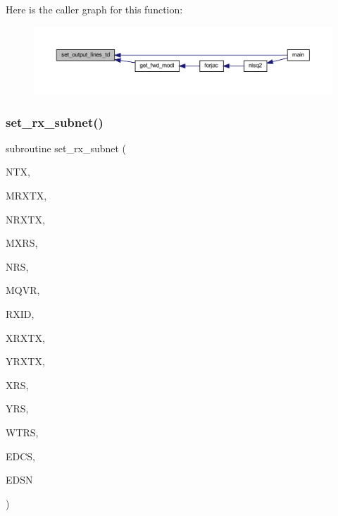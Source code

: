Here is the caller graph for this function\+:\nopagebreak
\begin{figure}[H]
\begin{center}
\leavevmode
\includegraphics[width=350pt]{Leroi_8f90_a2a5820b2a223f63d10cd7fe63469c604_icgraph}
\end{center}
\end{figure}
\mbox{\label{Leroi_8f90_a9100f1607055290b050e961c8027016a}} 
\subsubsection{\texorpdfstring{set\+\_\+rx\+\_\+subnet()}{set\_rx\_subnet()}}
{\footnotesize\ttfamily subroutine set\+\_\+rx\+\_\+subnet (\begin{DoxyParamCaption}\item[{integer}]{N\+TX,  }\item[{integer}]{M\+R\+X\+TX,  }\item[{integer, dimension(ntx)}]{N\+R\+X\+TX,  }\item[{integer}]{M\+X\+RS,  }\item[{integer, dimension(mrxtx,ntx)}]{N\+RS,  }\item[{integer}]{M\+Q\+VR,  }\item[{integer, dimension(mrxtx,ntx)}]{R\+X\+ID,  }\item[{real, dimension (mrxtx,ntx,mqvr)}]{X\+R\+X\+TX,  }\item[{real, dimension (mrxtx,ntx,mqvr)}]{Y\+R\+X\+TX,  }\item[{real, dimension (mxrs,mrxtx,ntx)}]{X\+RS,  }\item[{real, dimension (mxrs,mrxtx,ntx)}]{Y\+RS,  }\item[{real, dimension (mxrs,mrxtx,ntx)}]{W\+T\+RS,  }\item[{real, dimension (mrxtx,ntx)}]{E\+D\+CS,  }\item[{real, dimension (mrxtx,ntx)}]{E\+D\+SN }\end{DoxyParamCaption})}

